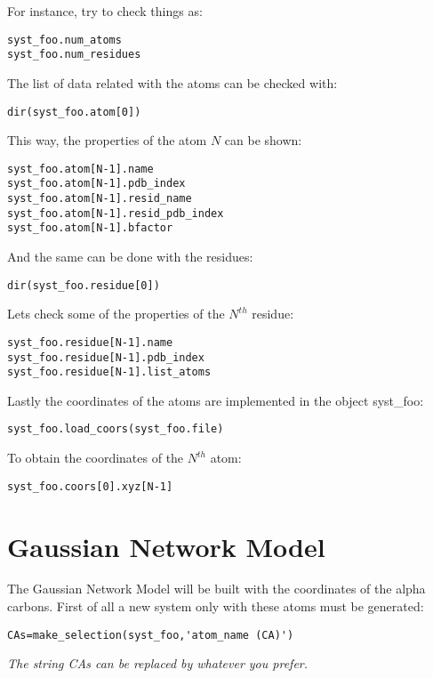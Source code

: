 \documentclass[12pt]{article}
\begin{document}
For instance, try to check things as:
\begin{verbatim}
syst_foo.num_atoms
syst_foo.num_residues
\end{verbatim}

The list of data related with the atoms can be checked with:
\begin{verbatim}
dir(syst_foo.atom[0])
\end{verbatim}

This way, the properties of the atom $N$ can be shown:
\begin{verbatim}
syst_foo.atom[N-1].name
syst_foo.atom[N-1].pdb_index
syst_foo.atom[N-1].resid_name
syst_foo.atom[N-1].resid_pdb_index
syst_foo.atom[N-1].bfactor
\end{verbatim}

And the same can be done with the residues:
\begin{verbatim}
dir(syst_foo.residue[0])
\end{verbatim}

Lets check some of the properties of the $N^{th}$ residue:
\begin{verbatim}
syst_foo.residue[N-1].name
syst_foo.residue[N-1].pdb_index
syst_foo.residue[N-1].list_atoms
\end{verbatim}

Lastly the coordinates of the atoms are implemented in the object syst\_foo:

\begin{verbatim}
syst_foo.load_coors(syst_foo.file)
\end{verbatim}

To obtain the coordinates of the $N^{th}$ atom:

\begin{verbatim}
syst_foo.coors[0].xyz[N-1]
\end{verbatim}

\section*{Gaussian Network Model}

The Gaussian Network Model will be built with the coordinates of the alpha carbons.
First of all a new system only with these atoms must be generated:

\begin{verbatim}
CAs=make_selection(syst_foo,'atom_name (CA)')
\end{verbatim}

\emph{The string CAs can be replaced by whatever you prefer.}
\end{document}
